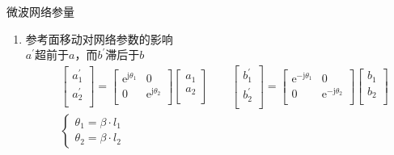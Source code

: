 \begin{frame}{微波网络参量}
    \begin{enumerate}
        \resume
        \item 参考面移动对网络参数的影响\\
              $a^{'}$超前于$a$，而$b^{'}$滞后于$b$
              \begin{align*}
                   & \begin{bmatrix*}
                         a_1^{'} \\
                         a_2^{'} \\
                     \end{bmatrix*}
                  =
                  \begin{bmatrix*}
                      \mathrm{e}^{\mathrm{j}\theta_1} & 0 \\
                      0 & \mathrm{e}^{\mathrm{j}\theta_2} \\
                  \end{bmatrix*}
                  \begin{bmatrix*}
                      a_1 \\
                      a_2 \\
                  \end{bmatrix*}
                  \qquad
                  \begin{bmatrix*}
                      b_1^{'} \\
                      b_2^{'} \\
                  \end{bmatrix*}
                  =
                  \begin{bmatrix*}
                      \mathrm{e}^{-\mathrm{j}\theta_1} & 0 \\
                      0 & \mathrm{e}^{-\mathrm{j}\theta_2} \\
                  \end{bmatrix*}
                  \begin{bmatrix*}
                      b_1 \\
                      b_2 \\
                  \end{bmatrix*}            \\
                   & \begin{cases}
                         \theta_1=\beta\cdot l_1 \\
                         \theta_2=\beta\cdot l_2
                     \end{cases}
              \end{align*}
    \end{enumerate}
\end{frame}

